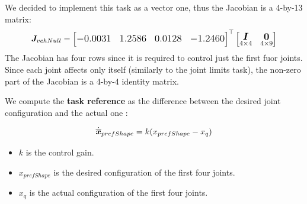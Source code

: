 \documentclass{article}
\begin{document}
We decided to implement this task as a vector one, thus the Jacobian is a 4-by-13 matrix:
\begin{equation}
\large
\boldsymbol{J}_{vehNull}=
\begin{bmatrix}-0.0031 & 1.2586 & 0.0128 & -1.2460 \end{bmatrix}^\top
    \begin{bmatrix}
     \underset{4\times4}{\boldsymbol{I}} & \underset{4\times9}{\boldsymbol{0}} \\
    \end{bmatrix}
\end{equation}
The Jacobian has four rows since it is required to control just the first fuor joints. Since each joint affects only itself (similarly to the joint limits task), the non-zero part of the Jacobian is a 4-by-4 identity matrix. 

We compute the \textbf{task reference} as the difference between the desired joint configuration and the actual one :

\begin{equation}
\large
   \dot{\overline{\boldsymbol{x}}}_{prefShape} = k(x_{prefShape} - x_{q}) %
\end{equation}
\begin{itemize}
    \item $k$ is the control gain.
    \item $x_{prefShape}$ is the desired configuration of the first four joints.
    \item $x_{q}$ is the actual configuration of the first four joints.
\end{itemize} 
\end{document}
